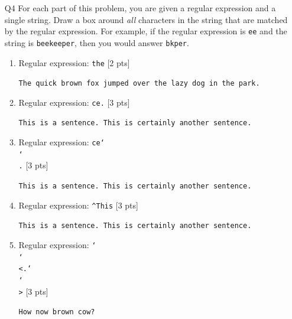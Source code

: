 \documentclass[12pt]{article}
\theoremstyle{Conjecture}
\theoremstyle{example}
\theoremstyle{remark}
\theoremstyle{lemma}
\theoremstyle{definition}
\theoremstyle{corol}
\theoremstyle{proposition}
\theoremstyle{condition}
\begin{document}
\begin{enumerate}
  \newpage

\item [Q4] For each part of this problem, you are given a regular expression and a single string. Draw a box around \emph{all} characters in the string that are matched by the regular expression. For example, if the regular expression is \texttt{ee} and the string is \texttt{beekeeper}, then you would answer \texttt{bkper}. 

\begin{enumerate}
  \item Regular expression: \texttt{\large the} [2 pts]
  \vspace{0.2in}
  \begin{center}
    \texttt{\large The quick brown fox jumped over the lazy dog in the park.}
  \end{center}
  \vspace{0.2in}
  \item Regular expression: \texttt{\large ce.} [3 pts]
  \vspace{0.2in}
  \begin{center}
    \texttt{\large This is a sentence. This is certainly another sentence.}
  \end{center}
  \vspace{0.2in}
  \item Regular expression: \texttt{\large ce\char`\\\char`\\.} [3 pts]
  \vspace{0.2in}
  \begin{center}
    \texttt{\large This is a sentence. This is certainly another sentence.}
  \end{center}
  \vspace{0.2in}
  \item Regular expression: \texttt{\large \textasciicircum This} [3 pts]
  \vspace{0.2in}
  \begin{center}
    \texttt{\large This is a sentence. This is certainly another sentence.}
  \end{center}
  \vspace{0.2in}
  \item Regular expression: \texttt{\large \char`\\\char`\\<.\string{3\string}\char`\\\char`\\>} [3 pts]
  \vspace{0.2in}
  \begin{center}
    \texttt{\large How now brown cow?}
  \end{center}
\end{enumerate}
\newpage 


\end{enumerate}
\end{document}

